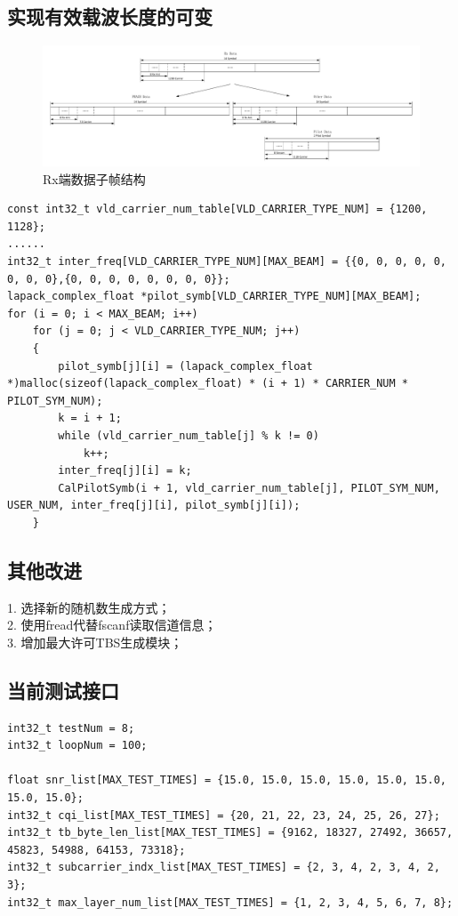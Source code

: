 \documentclass{article}
\begin{document}
\subsection{实现有效载波长度的可变}
\begin{figure}[H]
	\centering
	\includegraphics[width = \textwidth]{rxdata.pdf}
	\caption{Rx端数据子帧结构}
\end{figure}
\begin{lstlisting}
const int32_t vld_carrier_num_table[VLD_CARRIER_TYPE_NUM] = {1200, 1128};
......
int32_t inter_freq[VLD_CARRIER_TYPE_NUM][MAX_BEAM] = {{0, 0, 0, 0, 0, 0, 0, 0},{0, 0, 0, 0, 0, 0, 0, 0}};
lapack_complex_float *pilot_symb[VLD_CARRIER_TYPE_NUM][MAX_BEAM];
for (i = 0; i < MAX_BEAM; i++)
	for (j = 0; j < VLD_CARRIER_TYPE_NUM; j++)
	{
		pilot_symb[j][i] = (lapack_complex_float *)malloc(sizeof(lapack_complex_float) * (i + 1) * CARRIER_NUM * PILOT_SYM_NUM);
		k = i + 1;
		while (vld_carrier_num_table[j] % k != 0)
			k++;
		inter_freq[j][i] = k;
		CalPilotSymb(i + 1, vld_carrier_num_table[j], PILOT_SYM_NUM, USER_NUM, inter_freq[j][i], pilot_symb[j][i]);
	}
\end{lstlisting}

\subsection{其他改进}
1. 选择新的随机数生成方式；			\\
2. 使用fread代替fscanf读取信道信息；\\
3. 增加最大许可TBS生成模块；		\\

\subsection{当前测试接口}
\begin{lstlisting}
int32_t testNum = 8;
int32_t loopNum = 100;

float snr_list[MAX_TEST_TIMES] = {15.0, 15.0, 15.0, 15.0, 15.0, 15.0, 15.0, 15.0};
int32_t cqi_list[MAX_TEST_TIMES] = {20, 21, 22, 23, 24, 25, 26, 27};
int32_t tb_byte_len_list[MAX_TEST_TIMES] = {9162, 18327, 27492, 36657, 45823, 54988, 64153, 73318};
int32_t subcarrier_indx_list[MAX_TEST_TIMES] = {2, 3, 4, 2, 3, 4, 2, 3};
int32_t max_layer_num_list[MAX_TEST_TIMES] = {1, 2, 3, 4, 5, 6, 7, 8};	
\end{lstlisting}
\end{document}
